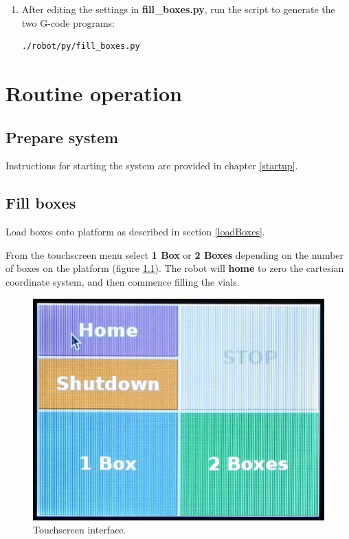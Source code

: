 \documentclass[]{book}
\theoremstyle{definition}
\theoremstyle{definition}
\theoremstyle{remark}
\begin{document}
\begin{enumerate}
\def\labelenumi{\arabic{enumi}.}
\setcounter{enumi}{2}
\item
  After editing the settings in \textbf{fill\_boxes.py}, run the script
  to generate the two G-code programs:

\begin{verbatim}
./robot/py/fill_boxes.py
\end{verbatim}
\end{enumerate}

\chapter{Routine operation}\label{operation}

\section{Prepare system}\label{prepare-system}

Instructions for starting the system are provided in chapter
\ref{startup}.

\section{Fill boxes}\label{fill-boxes}

Load boxes onto platform as described in section \ref{loadBoxes}.

From the touchscreen menu select \textbf{1 Box} or \textbf{2 Boxes}
depending on the number of boxes on the platform (figure
\ref{fig:touchscreen}). The robot will \textbf{home} to zero the
cartesian coordinate system, and then commence filling the vials.

\begin{figure}

{\centering \includegraphics[width=0.6\linewidth]{images/gui} 

}

\caption{Touchscreen interface.}\label{fig:touchscreen}
\end{figure}
\end{document}
